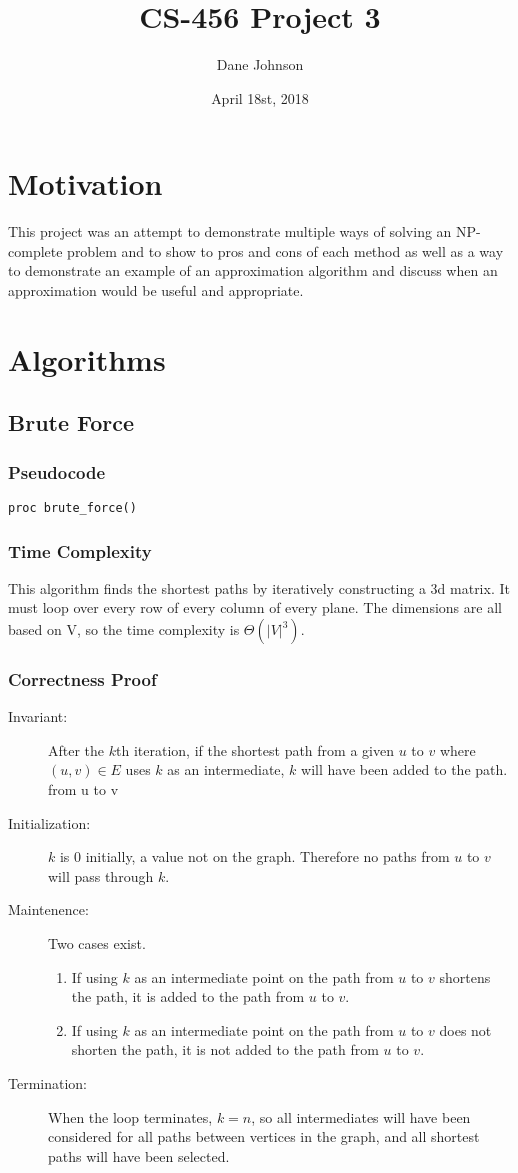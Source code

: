 \documentclass[a4paper,12pt]{article}
\title{CS-456 Project 3}
\author{Dane Johnson}
\date{April 18st, 2018}
\begin{document}
\maketitle
\newpage
\section{Motivation}

This project was an attempt to demonstrate multiple ways of solving an NP-complete problem and to show to pros and cons
of each method as well as a way to demonstrate an example of an approximation algorithm and discuss when an approximation
would be useful and appropriate.

\section{Algorithms}
\subsection{Brute Force}
\subsubsection{Pseudocode}
\begin{lstlisting}[mathescape=true]
proc brute_force()
\end{lstlisting}
\subsubsection{Time Complexity}
This algorithm finds the shortest paths by iteratively constructing a 3d matrix. It must loop over every row of every column of every plane.
The dimensions are all based on V, so the time complexity is $\Theta(|V|^3)$.
\subsubsection{Correctness Proof}
\begin{description}
\item [Invariant: ] After the $k$th iteration, if the shortest path from a given $u$ to $v$ where $(u,v)\in E$ uses $k$ as an intermediate, $k$ will have been added to the path.
  from u to v
\item [Initialization: ] $k$ is 0 initially, a value not on the graph. Therefore no paths from $u$ to $v$ will pass through $k$.
\item [Maintenence: ] Two cases exist.
  \begin{enumerate}
  \item If using $k$ as an intermediate point on the path from $u$ to $v$ shortens the path, it is added to the path from $u$ to $v$.
  \item If using $k$ as an intermediate point on the path from $u$ to $v$ does not shorten the path, it is not added to the path from $u$ to $v$.
  \end{enumerate}
\item [Termination: ] When the loop terminates, $k = n$, so all intermediates will have been considered for all paths between vertices in the graph, and all shortest
  paths will have been selected.
\end{description}
\end{document}
